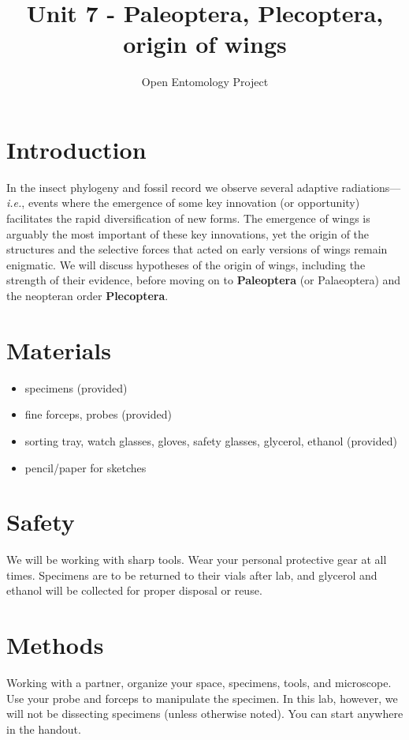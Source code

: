 \documentclass[letterpaper, 11pt]{article}
\title{Unit 7 - Paleoptera, Plecoptera, origin of wings}
\author{Open Entomology Project}
\begin{document}
\cleanlookdateon %
\maketitle
\thispagestyle{fancy}
\section*{Introduction}
In the insect phylogeny and fossil record we observe several adaptive radiations---\textit{i.e.}, events where the emergence of some key innovation (or opportunity) facilitates the rapid diversification of new forms. The emergence of wings is arguably the most important of these key innovations, yet the origin of the structures and the selective forces that acted on early versions of wings remain enigmatic. We will discuss hypotheses of the origin of wings, including the strength of their evidence, before moving on to \textbf{Paleoptera} (or Palaeoptera) and the neopteran order \textbf{Plecoptera}.

\section*{Materials}

\begin{itemize}
\item specimens (provided)
\item fine forceps, probes (provided)
\item sorting tray, watch glasses, gloves, safety glasses, glycerol, ethanol (provided)
\item pencil/paper for sketches
\end{itemize}

\section*{Safety}
We will be working with sharp tools. Wear your personal protective gear at all times. Specimens are to be returned to their vials after lab, and glycerol and ethanol will be collected for proper disposal or reuse.

\section*{Methods}
Working with a partner, organize your space, specimens, tools, and microscope. Use your probe and forceps to manipulate the specimen. In this lab, however, we will not be dissecting specimens (unless otherwise noted). You can start anywhere in the handout.
\end{document}
